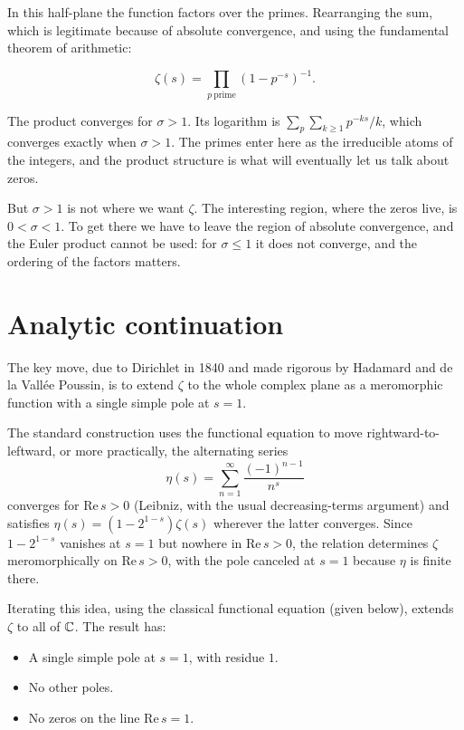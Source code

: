In this half-plane the function factors over the primes. Rearranging the sum,
which is legitimate because of absolute convergence, and using the fundamental
theorem of arithmetic:

\begin{equation}
\zeta(s) = \prod_{p\ \mathrm{prime}} \left(1 - p^{-s}\right)^{-1}.
\label{eq:euler-product}
\end{equation}

The product converges for $\sigma > 1$. Its logarithm is
$\sum_p \sum_{k \ge 1} p^{-ks}/k$, which converges exactly when $\sigma > 1$.
The primes enter here as the irreducible atoms of the integers, and the product
structure is what will eventually let us talk about zeros.

But $\sigma > 1$ is not where we want $\zeta$. The interesting region, where the
zeros live, is $0 < \sigma < 1$. To get there we have to leave the region of
absolute convergence, and the Euler product cannot be used: for $\sigma \le 1$
it does not converge, and the ordering of the factors matters.

\section{Analytic continuation}The key move, due to Dirichlet in 1840 and made rigorous by Hadamard and
de la Vallée Poussin, is to extend $\zeta$ to the whole complex plane as a
meromorphic function with a single simple pole at $s = 1$.

The standard construction uses the functional equation to move rightward-to-
leftward, or more practically, the alternating series
\begin{equation}
\eta(s) = \sum_{n=1}^{\infty} \frac{(-1)^{n-1}}{n^{s}}
\label{eq:eta}
\end{equation}
converges for $\mathrm{Re}\,  s > 0$ (Leibniz, with the usual decreasing-terms argument)
and satisfies $\eta(s) = (1 - 2^{1-s})\zeta(s)$ wherever the latter converges.
Since $1 - 2^{1-s}$ vanishes at $s = 1$ but nowhere in $\mathrm{Re}\,  s > 0$, the
relation determines $\zeta$ meromorphically on $\mathrm{Re}\,  s > 0$, with the pole
canceled at $s=1$ because $\eta$ is finite there.

Iterating this idea, using the classical functional equation (given below),
extends $\zeta$ to all of $\mathbb{C}$. The result has:

\begin{itemize}
\item A single simple pole at $s = 1$, with residue $1$.
\item No other poles.
\item No zeros on the line $\mathrm{Re}\,  s = 1$.
\end{itemize}

